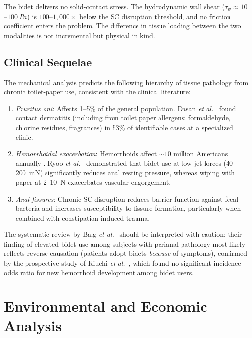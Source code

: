 \documentclass[10pt,letterpaper]{article}
\begin{document}
The bidet delivers no solid-contact stress. The hydrodynamic wall shear
($\tau_w \approx 10$--$100~Pa$) is $100$--$1{,}000\times$ below the
SC disruption threshold, and no friction coefficient enters the problem.
The difference in tissue loading between the two modalities is not
incremental but physical in kind.

\subsection{Clinical Sequelae}
\label{subsec:clinical}

The mechanical analysis predicts the following hierarchy of tissue pathology
from chronic toilet-paper use, consistent with the clinical literature:

\begin{enumerate}[leftmargin=*]
    \item \emph{Pruritus ani}: Affects 1--5\% of the general population.
    Dasan \textit{et al.}\ \citep{Dasan1999} found contact dermatitis (including
    from toilet paper allergens: formaldehyde, chlorine residues, fragrances)
    in 53\% of identifiable cases at a specialized clinic.
    \item \emph{Hemorrhoidal exacerbation}: Hemorrhoids affect $\sim10$ million
    Americans annually \citep{Peery2014}. Ryoo \textit{et al.}\ \citep{Ryoo2011}
    demonstrated that bidet use at low jet forces (40--200~mN) significantly
    reduces anal resting pressure, whereas wiping with paper at 2--10~N
    exacerbates vascular engorgement.
    \item \emph{Anal fissures}: Chronic SC disruption reduces barrier function
    against fecal bacteria and increases susceptibility to fissure formation,
    particularly when combined with constipation-induced trauma.
\end{enumerate}

The systematic review by Baig \textit{et al.}\ \citep{Baig2022} should be
interpreted with caution: their finding of elevated bidet use among subjects
with perianal pathology most likely reflects reverse causation (patients adopt
bidets \emph{because} of symptoms), confirmed by the prospective study of
Kiuchi \textit{et al.}\ \citep{Kiuchi2017}, which found no significant incidence
odds ratio for new hemorrhoid development among bidet users.

\section{Environmental and Economic Analysis}
\label{sec:enviro}
\end{document}
